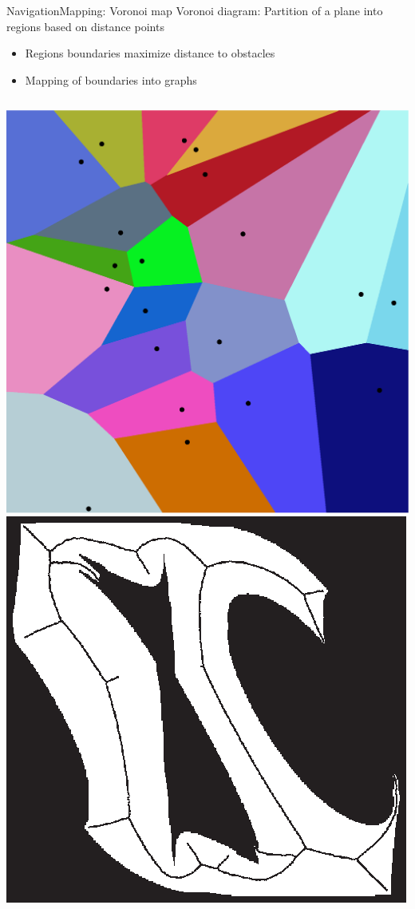 \documentclass[10pt,compress]{beamer} %
\begin{document}
\begin{frame}{Navigation}{Mapping: Voronoi map}
	Voronoi diagram: Partition of a plane into regions based on distance points
	\begin{itemize}
	   \item Regions boundaries maximize distance to obstacles
	   \item Mapping of boundaries into graphs
	\end{itemize}

	\begin{columns}
			\centering\includegraphics[width=\linewidth]{figs/voronoi.eps}
			\centering\includegraphics[width=\linewidth]{figs/armVoronoi.eps}
	\end{columns}


\end{frame}
\end{document}
